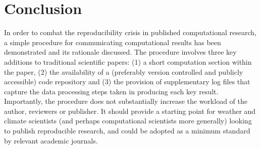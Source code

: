 \section{Conclusion}

In order to combat the reproducibility crisis in published computational research, a simple procedure for communicating computational results has been demonstrated \citep{Irving2015} and its rationale discussed. The procedure involves three key additions to traditional scientific papers: (1) a short computation section within the paper, (2) the availability of a (preferably version controlled and publicly accessible) code repository and (3) the provision of supplementary log files that capture the data processing steps taken in producing each key result. Importantly, the procedure does not substantially increase the workload of the author, reviewers or publisher. It should provide a starting point for weather and climate scientists (and perhaps computational scientists more generally) looking to publish reproducible research, and could be adopted as a minimum standard by relevant academic journals.